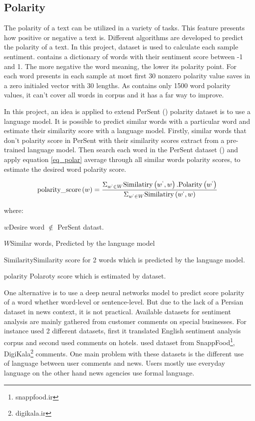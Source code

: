\subsection{Polarity}  
The polarity of a text can be utilized in a variety of tasks. This feature presents how positive or negative a text is. Different algorithms are developed to predict the polarity of a text. In this project, \cite{persent} dataset is used to calculate each sample sentiment. \cite{persent} contains a dictionary of words with their sentiment score between -1 and 1. The more negative the word meaning, the lower its polarity point. For each word presents in each sample at most first 30 nonzero polarity value saves in a zero initialed vector with 30 lengths. As \cite{persent} contains only 1500 word polarity values, it can't cover all words in corpus and it has a far way to improve. 

In this project, an idea is applied to extend PerSent (\cite{persent}) polarity dataset is to use a language model. It is possible to predict similar words with a particular word and estimate their similarity score with a language model. Firstly, similar words that don't polarity score in PerSent with their similarity scores extract from a pre-trained language model. Then search each word in the PerSent dataset (\cite{persent}) and apply equation \ref{eq_polar} average through all similar words polarity scores, to estimate the desired word polarity score.

\begin{equation}
	\label{eq_polar}
	\text{polarity\_score}\left(w\right) = \frac{\Sigma_{w^{`} \in W} \text{Similatiry}\left(w^{`}, w\right) . \text{Polarity}\left(w^{`}\right)}{\Sigma_{w^{`} \in W} \text{Similatiry}\left(w^{`}, w\right)}
\end{equation}

where: 
\begin{eqexpl}[25mm]
	\item{$w$}Desire word $\notin$ PerSent datast.
	\item{$W$}Similar words, Predicted by the language model
	\item{$\text{Similarity}$}Similarity score for 2 words which is predicted by the language model.
	\item{$\text{polarity}$} Polaroty score which is estimated by \cite{persent} dataset.
\end{eqexpl}

\bigbreak
One alternative is to use a deep neural networks model to predict score polarity of a word whether word-level or sentence-level. But due to the lack of a Persian dataset in news context, it is not practical. Available datasets for sentiment analysis are mainly gathered from customer comments on special businesses. For instance \cite{polar_hotel} used 2 different datasets, first it translated English sentiment analysis corpus and second used comments on hotels. \cite{polar_servic} used dataset from SnappFood\footnote{snappfood.ir}, DigiKala\footnote{digikala.ir} comments. One main problem with these datasets is the different use of language between user comments and news. Users mostly use everyday language on the other hand news agencies use formal language.



